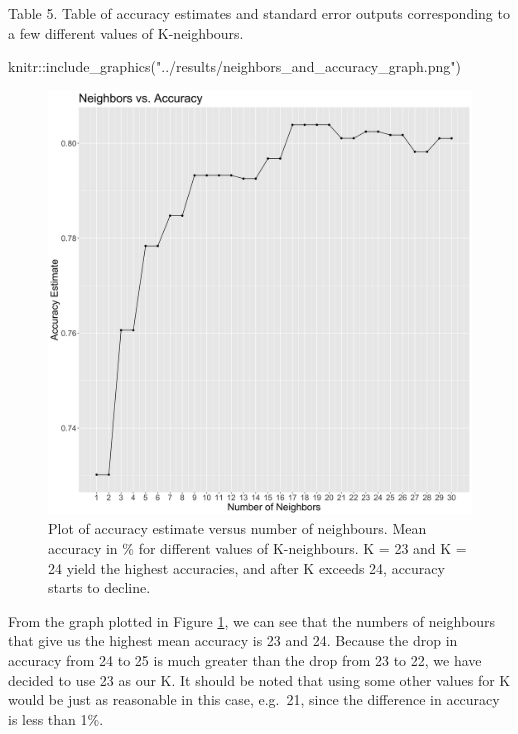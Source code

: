 \documentclass[
]{article}
\newenvironment{Shaded}{\begin{snugshade}}{\end{snugshade}}
\newcommand{\FunctionTok}[1]{\textcolor[rgb]{0.00,0.00,0.00}{#1}}
\newcommand{\NormalTok}[1]{#1}
\newcommand{\SpecialCharTok}[1]{\textcolor[rgb]{0.00,0.00,0.00}{#1}}
\newcommand{\StringTok}[1]{\textcolor[rgb]{0.31,0.60,0.02}{#1}}
\begin{document}
Table 5. Table of accuracy estimates and standard error outputs
corresponding to a few different values of K-neighbours.

\begin{Shaded}
\begin{Highlighting}[]
\NormalTok{knitr}\SpecialCharTok{::}\FunctionTok{include\_graphics}\NormalTok{(}\StringTok{"../results/neighbors\_and\_accuracy\_graph.png"}\NormalTok{)}
\end{Highlighting}
\end{Shaded}

\begin{figure}
\centering
\includegraphics{../results/neighbors_and_accuracy_graph.png}
\caption{\label{fig:acc-plot}Plot of accuracy estimate versus number of neighbours. Mean accuracy in \% for different values of K-neighbours. K = 23 and K = 24 yield the highest accuracies, and after K exceeds 24, accuracy starts to decline.}
\end{figure}

From the graph plotted in Figure \ref{fig:acc-plot}, we can see that the numbers of neighbours that give us the highest mean accuracy is 23 and 24. Because the drop in accuracy from 24 to 25 is much greater than the drop from 23 to 22, we have decided to use 23 as our K. It should be noted that using some other values for K would be just as reasonable in this case, e.g.~21, since the difference in accuracy is less than 1\%.
\end{document}
